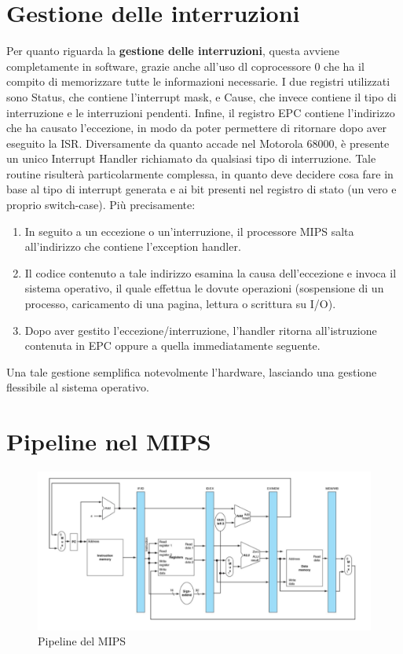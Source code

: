 \section{Gestione delle interruzioni}
Per quanto riguarda la \textbf{gestione delle interruzioni}, questa avviene completamente in software, grazie anche all'uso dl coprocessore 0 che ha il compito di memorizzare tutte le informazioni necessarie. I due registri utilizzati sono Status, che contiene l'interrupt mask, e Cause, che invece contiene il tipo di interruzione e le interruzioni pendenti. Infine, il registro EPC contiene l'indirizzo che ha causato l'eccezione, in modo da poter permettere di ritornare dopo aver eseguito la ISR. Diversamente da quanto accade nel Motorola 68000, è presente un unico Interrupt Handler richiamato da qualsiasi tipo di interruzione. Tale routine risulterà particolarmente complessa, in quanto deve decidere cosa fare in base al tipo di interrupt generata e ai bit presenti nel registro di stato (un vero e proprio switch-case). Più precisamente:
\begin{enumerate}
	\item In seguito a un eccezione o un'interruzione, il processore MIPS salta all'indirizzo che contiene l'exception handler.
	\item Il codice contenuto a tale indirizzo esamina la causa dell'eccezione e invoca il sistema operativo, il quale effettua le dovute operazioni (sospensione di un processo, caricamento di una pagina, lettura o scrittura su I/O).
	\item Dopo aver gestito l'eccezione/interruzione, l'handler ritorna all'istruzione contenuta in EPC oppure a quella immediatamente seguente.
\end{enumerate}
Una tale gestione semplifica notevolmente l'hardware, lasciando una gestione flessibile al sistema operativo.

\section{Pipeline nel MIPS}


\begin{figure}[!h]
    \centering
    \includegraphics[width=0.7\linewidth]{img/Pipeline-MIPS.png}
    \caption{Pipeline del MIPS}
    \label{fig:mips-pipeline}
\end{figure}

